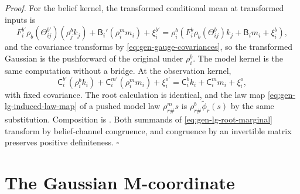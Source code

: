 \noindent\emph{Proof.}
For the belief kernel, the transformed conditional mean at transformed inputs is
\begin{equation}
F_i^{b\prime}\rho_b(\Theta_{ij}^{b\prime})(\rho^b_jk_j)
+\mathsf B_i'(\rho^m_im_i)+\xi_i^{b\prime}
=\rho^b_i\left(
F_i^b\rho_b(\Theta_{ij}^b)k_j+\mathsf B_im_i+\xi_i^b
\right),
\label{eq:gen-gauge-mean-identity}
\end{equation}
and the covariance transforms by \eqref{eq:gen-gauge-covariances}, so the
transformed Gaussian is the pushforward of the original under \(\rho^b_i\). The
model kernel is the same computation without a bridge. At the observation
kernel,
\begin{equation}
\mathsf C_i^{b\prime}(\rho^b_ik_i)+\mathsf C_i^{m\prime}(\rho^m_im_i)+\xi_i^{o\prime}
=\mathsf C_i^bk_i+\mathsf C_i^mm_i+\xi_i^o,
\label{eq:gen-gauge-observation-identity}
\end{equation}
with fixed covariance. The root calculation is identical, and the law map
\eqref{eq:gen-lg-induced-law-map} of a pushed model law
\(\rho^m_{r\#}s\) is \(\rho^b_{r\#}\widetilde\phi_r(s)\) by the same
substitution. Composition is .
Both summands of \eqref{eq:gen-lg-root-marginal} transform by belief-channel
congruence, and congruence by an invertible matrix preserves positive
definiteness. \(\square\)

\section{The Gaussian M-coordinate}

